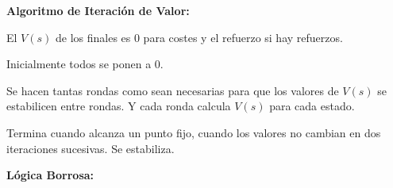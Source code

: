 \documentclass[12pt, twoside, openright]{report} %
\begin{document}
\begin{itemize}
\begin{itemize}
\begin{itemize}
\begin{itemize}
          
		  
            \textbf{Algoritmo de Iteración de Valor:}

			
            
			
              El $V(s)$ de los finales es 0 para costes y el refuerzo si
              hay refuerzos.
             
			  
              Inicialmente todos se ponen a 0.
             
			  
              Se hacen tantas rondas como sean necesarias para que los
              valores de $V(s)$ se estabilicen entre rondas. Y cada ronda
              calcula $V(s)$ para cada estado.
              
			  
              Termina cuando alcanza un punto fijo, cuando los valores
              no cambian en dos iteraciones sucesivas. Se estabiliza.
            
			  
        \end{itemize}
      \end{itemize}
    \end{itemize}
  \end{itemize}

 
  \textbf{Lógica Borrosa:}
  
\end{document}
